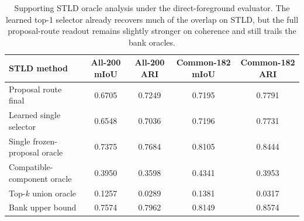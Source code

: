 \begin{table}[t]
\centering
\scriptsize
\setlength{\tabcolsep}{5pt}
\renewcommand{\arraystretch}{0.98}
\begin{tabular}{@{}lcccc@{}}
\toprule
STLD method & All-200 mIoU & All-200 ARI & Common-182 mIoU & Common-182 ARI \\
\midrule
Proposal route final & 0.6705 & 0.7249 & 0.7195 & 0.7791 \\
Learned single selector & 0.6548 & 0.7036 & 0.7196 & 0.7731 \\
Single frozen-proposal oracle & 0.7375 & 0.7684 & 0.8105 & 0.8444 \\
Compatible-component oracle & 0.3950 & 0.3598 & 0.4341 & 0.3953 \\
Top-$k$ union oracle & 0.1257 & 0.0289 & 0.1381 & 0.0317 \\
Bank upper bound & 0.7574 & 0.7962 & 0.8149 & 0.8574 \\
\bottomrule
\end{tabular}
\caption{Supporting STLD oracle analysis under the direct-foreground evaluator. The learned top-1 selector already recovers much of the overlap on STLD, but the full proposal-route readout remains slightly stronger on coherence and still trails the bank oracles.}
\label{tab:stld_oracles}
\end{table}
